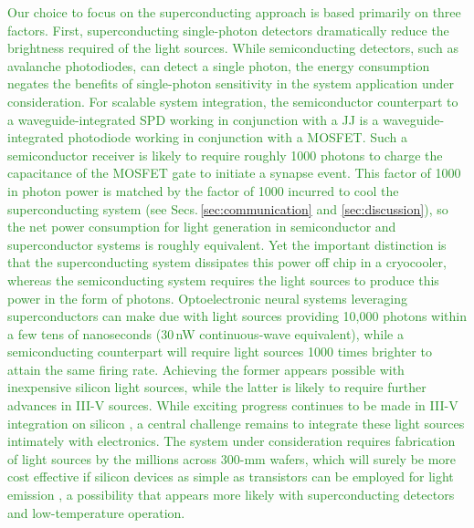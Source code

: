 \documentclass[twocolumn]{article}
\begin{document}
\textcolor{ForestGreen}{Our choice to focus on the superconducting approach is based primarily on three factors. First, superconducting single-photon detectors dramatically reduce the brightness required of the light sources. While semiconducting detectors, such as avalanche photodiodes, can detect a single photon, the energy consumption negates the benefits of single-photon sensitivity in the system application under consideration. For scalable system integration, the semiconductor counterpart to a waveguide-integrated SPD working in conjunction with a JJ is a waveguide-integrated photodiode working in conjunction with a MOSFET. Such a semiconductor receiver is likely to require roughly 1000 photons to charge the capacitance of the MOSFET gate \cite{mi2017} to initiate a synapse event. This factor of 1000 in photon power is matched by the factor of 1000 incurred to cool the superconducting system (see Secs.\,\ref{sec:communication} and \ref{sec:discussion}), so the net power consumption for light generation in semiconductor and superconductor systems is roughly equivalent. Yet the important distinction is that the superconducting system dissipates this power off chip in a cryocooler, whereas the semiconducting system requires the light sources to produce this power in the form of photons. Optoelectronic neural systems leveraging superconductors can make due with light sources providing 10,000 photons within a few tens of nanoseconds (30\,nW continuous-wave equivalent), while a semiconducting counterpart will require light sources 1000 times brighter to attain the same firing rate. Achieving the former appears possible with inexpensive silicon light sources, while the latter is likely to require further advances in III-V sources. While exciting progress continues to be made in III-V integration on silicon \cite{tapa2019,hala2020}, a central challenge remains to integrate these light sources intimately with electronics. The system under consideration requires fabrication of light sources by the millions across 300-mm wafers, which will surely be more cost effective if silicon devices as simple as transistors can be employed for light emission \cite{buch2017}, a possibility that appears more likely with superconducting detectors and low-temperature operation.}
\end{document}
